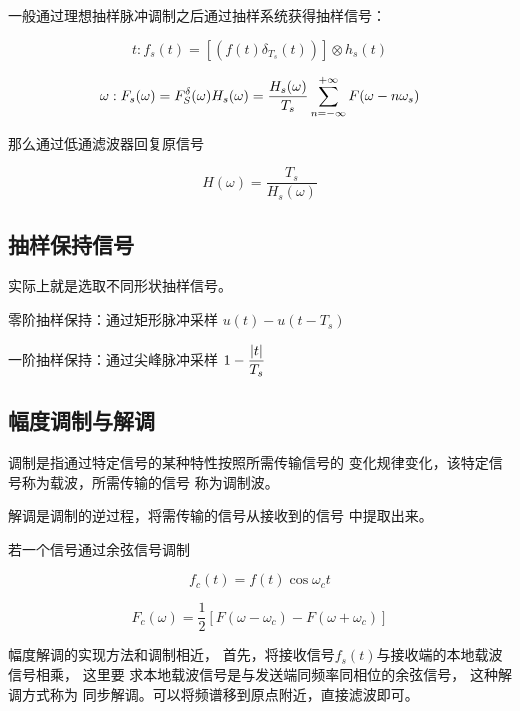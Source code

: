 \documentclass[cn,11pt,chinese,black,simple]{../elegantbook}
\begin{document}
一般通过理想抽样脉冲调制之后通过抽样系统获得抽样信号：

\[t: f_s(t) = [(f(t) \delta_{T_s}(t))] \otimes h_s(t) \]

\[\omega: F_s(\omega) = F_S^\delta(\omega) H_s(\omega) = \dfrac{H_s(\omega)}{T_s}\displaystyle\sum_{n = -\infty}^{+\infty} F(\omega - n \omega_s)\]

那么通过低通滤波器回复原信号

\[H(\omega) = \dfrac{T_s}{H_s(\omega)}\]

\subsection{抽样保持信号}

实际上就是选取不同形状抽样信号。

零阶抽样保持：通过矩形脉冲采样 \(u(t)-u(t-T_s)\)

一阶抽样保持：通过尖峰脉冲采样 \(1 - \dfrac{\left| t \right|}{T_s}\)

\subsection{幅度调制与解调}

调制是指通过特定信号的某种特性按照所需传输信号的
变化规律变化，该特定信号称为载波，所需传输的信号
称为调制波。

解调是调制的逆过程，将需传输的信号从接收到的信号
中提取出来。

若一个信号通过余弦信号调制

\[f_c(t) = f(t) \cos \omega_c t\]

\[F_c(\omega) = \dfrac{1}{2} [F(\omega-\omega_c) - F(\omega + \omega_c)]\]

幅度解调的实现方法和调制相近， 首先，将接收信号\(f_s(t)\)与接收端的本地载波信号相乘， 这里要
求本地载波信号是与发送端同频率同相位的余弦信号， 这种解调方式称为
同步解调。可以将频谱移到原点附近，直接滤波即可。


\ifx\mainclass\undefined
\end{document}
